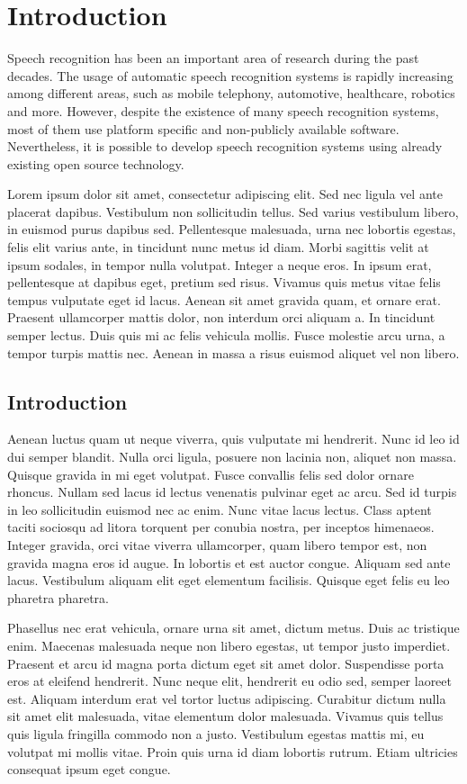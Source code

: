 \section{Introduction}
Speech recognition has been an important area of research during the past
decades.  The usage of automatic speech recognition systems is rapidly
increasing among different areas, such as mobile telephony, automotive,
healthcare, robotics and more. However, despite the existence of many speech
recognition systems, most of them use platform specific and non-publicly
available software. Nevertheless, it is possible to develop speech recognition
systems using already existing open source technology.

Lorem ipsum dolor sit amet, consectetur adipiscing elit. Sed nec ligula vel
ante placerat dapibus. Vestibulum non sollicitudin tellus. Sed varius
vestibulum libero, in euismod purus dapibus sed. Pellentesque malesuada, urna
nec lobortis egestas, felis elit varius ante, in tincidunt nunc metus id diam.
Morbi sagittis velit at ipsum sodales, in tempor nulla volutpat. Integer a
neque eros. In ipsum erat, pellentesque at dapibus eget, pretium sed risus.
Vivamus quis metus vitae felis tempus vulputate eget id lacus. Aenean sit amet
gravida quam, et ornare erat. Praesent ullamcorper mattis dolor, non interdum
orci aliquam a. In tincidunt semper lectus. Duis quis mi ac felis vehicula
mollis. Fusce molestie arcu urna, a tempor turpis mattis nec. Aenean in massa a
risus euismod aliquet vel non libero.

\subsection{Introduction}
Aenean luctus quam ut neque viverra, quis vulputate mi hendrerit. Nunc id leo
id dui semper blandit. Nulla orci ligula, posuere non lacinia non, aliquet non
massa. Quisque gravida in mi eget volutpat. Fusce convallis felis sed dolor
ornare rhoncus. Nullam sed lacus id lectus venenatis pulvinar eget ac arcu. Sed
id turpis in leo sollicitudin euismod nec ac enim. Nunc vitae lacus lectus.
Class aptent taciti sociosqu ad litora torquent per conubia nostra, per
inceptos himenaeos. Integer gravida, orci vitae viverra ullamcorper, quam
libero tempor est, non gravida magna eros id augue. In lobortis et est auctor
congue. Aliquam sed ante lacus. Vestibulum aliquam elit eget elementum
facilisis. Quisque eget felis eu leo pharetra pharetra.

Phasellus nec erat vehicula, ornare urna sit amet, dictum metus. Duis ac
tristique enim. Maecenas malesuada neque non libero egestas, ut tempor justo
imperdiet. Praesent et arcu id magna porta dictum eget sit amet dolor.
Suspendisse porta eros at eleifend hendrerit. Nunc neque elit, hendrerit eu
odio sed, semper laoreet est. Aliquam interdum erat vel tortor luctus
adipiscing. Curabitur dictum nulla sit amet elit malesuada, vitae elementum
dolor malesuada. Vivamus quis tellus quis ligula fringilla commodo non a justo.
Vestibulum egestas mattis mi, eu volutpat mi mollis vitae. Proin quis urna id
diam lobortis rutrum. Etiam ultricies consequat ipsum eget congue.

